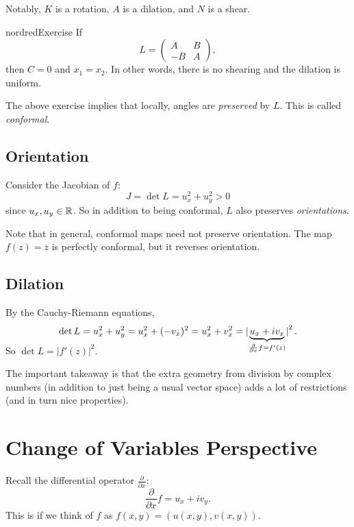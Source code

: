 Notably, $K$ is a rotation, $A$ is a dilation, and $N$
is a shear.

\begin{mybox}{nordred}{Exercise}
  If
  \[
  L =
  \left(\begin{matrix}
      A & B \\
      -B & A
  \end{matrix}\right)
  ,\]
  then $C = 0$ and $x_1 = x_2$. In other words, there
  is no shearing and the dilation is uniform.
\end{mybox}

The above exercise implies that locally, angles are
\textit{preserved} by $L$. This is called
\textit{conformal}.

\subsection{Orientation}
Consider the Jacobian of $f$:
\[
J = \det L = u_x^2 + u_y^2 > 0
\]
since $u_x, u_y \in \mathbb{R}$. So in addition to being
conformal, $L$ also preserves \textit{orientations}.

Note that in general, conformal maps need not preserve
orientation. The map $f(z) = \overline{z}$ is perfectly
conformal, but it reverses orientation.

\subsection{Dilation}
By the Cauchy-Riemann equations,
\[
\det L = u_x^2 + u_y^2 = u_x^2 + (-v_x)^2
= u_x^2 + v_x^2 = \left\lvert\smash[b]{\underbrace{u_x + iv_x}_{\frac{\partial}{\partial x} f = f'(z)}}\right\rvert^2
.\]
So $\det L = |f'(z)|^2$.

The important takeaway is that the extra geometry from
division by complex numbers (in addition to just being a
usual vector space) adds a lot of restrictions (and
in turn nice properties).

\section{Change of Variables Perspective}
Recall the differential operator
$\frac{\partial}{\partial x}$:
\[
\frac{\partial}{\partial x} f = u_x + iv_y
.\]
This is if we think of $f$ as
$f(x, y) = (u(x, y), v(x, y))$.

